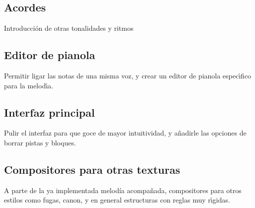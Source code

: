 \documentclass[a4paper,11pt]{article}
\begin{document}
\subsection {Acordes}

Introducci\'on de otras tonalidades y ritmos

\subsection {Editor de pianola}

Permitir ligar las notas de una misma voz, y crear un editor de pianola espec\'\i fico para la melod\'\i a.

\subsection {Interfaz principal}

Pulir el interfaz para que goce de mayor intuitividad, y a\~nadirle las opciones de borrar pistas y bloques.

\subsection {Compositores para otras texturas}

A parte de la ya implementada melod\'ia acompa\~nada, compositores para otros estilos como fugas, canon, y en general estructuras con reglas muy r\'\i gidas.
\end{document}
